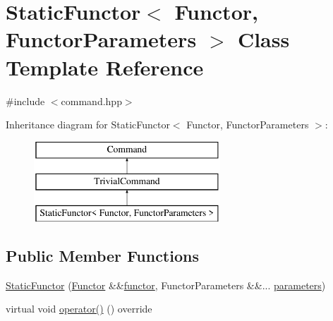 \hypertarget{class_static_functor}{}\section{Static\+Functor$<$ Functor, Functor\+Parameters $>$ Class Template Reference}
\label{class_static_functor}


{\ttfamily \#include $<$command.\+hpp$>$}

Inheritance diagram for Static\+Functor$<$ Functor, Functor\+Parameters $>$\+:\begin{figure}[H]
\begin{center}
\leavevmode
\includegraphics[height=3.000000cm]{class_static_functor}
\end{center}
\end{figure}
\subsection*{Public Member Functions}
\begin{DoxyCompactItemize}
\item 
\mbox{\hyperlink{class_static_functor_a61ee85704ebc97245006d4d8801fd58f}{Static\+Functor}} (\mbox{\hyperlink{class_functor}{Functor}} \&\&\mbox{\hyperlink{class_static_functor_aea8563c235a2dea8474da84504c51b58}{functor}}, Functor\+Parameters \&\&... \mbox{\hyperlink{class_static_functor_aaa5d69cb0c000ea6c4846296de2c7f7f}{parameters}})
\item 
virtual void \mbox{\hyperlink{class_static_functor_a1d8fe0ec2f9965c5f95ad182a8df510b}{operator()}} () override
\end{DoxyCompactItemize}
